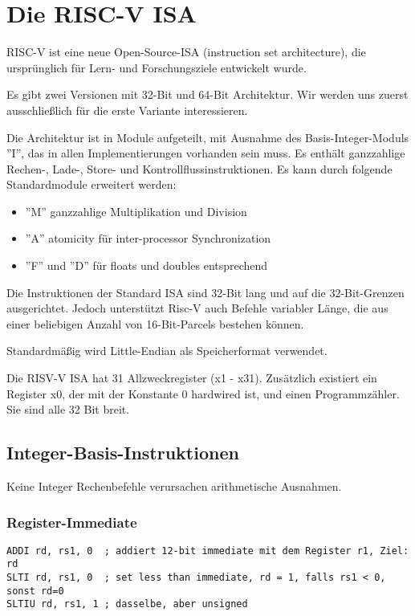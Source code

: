 \section{Die RISC-V ISA}

RISC-V ist eine neue Open-Source-ISA (instruction set architecture), die
ursprünglich für Lern- und Forschungsziele entwickelt wurde.

Es gibt zwei Versionen mit 32-Bit und 64-Bit Architektur. Wir werden uns
zuerst ausschließlich für die erste Variante interessieren.

Die Architektur ist in Module aufgeteilt, mit Ausnahme des Basis-Integer-Moduls ''I'', %
das in allen Implementierungen vorhanden sein muss. Es enthält ganzzahlige
Rechen-, Lade-, Store- und Kontrollflussinstruktionen. Es kann durch folgende
Standardmodule erweitert werden:

\begin{itemize}
\item ''M'' ganzzahlige Multiplikation und Division
\item ''A'' atomicity für inter-processor Synchronization
\item ''F'' und ''D'' für floats und doubles entsprechend
\end{itemize}

Die Instruktionen der Standard ISA sind 32-Bit lang und auf die
32-Bit-Grenzen ausgerichtet. Jedoch unterstützt Risc-V auch Befehle variabler Länge, die
aus einer beliebigen Anzahl von 16-Bit-Parcels bestehen können.

Standardmäßig wird Little-Endian als Speicherformat verwendet.

Die RISV-V ISA hat 31 Allzweckregister (x1 - x31). Zusätzlich existiert ein Register x0, der mit der Konstante 0 hardwired ist, und einen Programmzähler. Sie sind alle 32 Bit breit.

\subsection{Integer-Basis-Instruktionen}

Keine Integer Rechenbefehle verursachen arithmetische Ausnahmen.

\subsubsection{Register-Immediate}

\begin{lstlisting}[style=risc-v_Assembler]
ADDI rd, rs1, 0  ; addiert 12-bit immediate mit dem Register r1, Ziel: rd
SLTI rd, rs1, 0  ; set less than immediate, rd = 1, falls rs1 < 0, sonst rd=0
SLTIU rd, rs1, 1 ; dasselbe, aber unsigned
\end{lstlisting}

